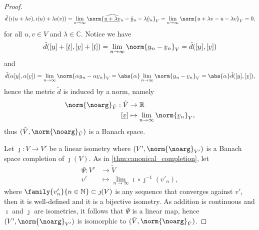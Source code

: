 \begin{proof}
\begin{equation*}
        \tilde{d}\left(\imath(u + \lambda v), \imath(u) + \lambda \imath(v)\right) = \lim_{n\to\infty}{\norm{\sequnder{\widehat{u + \lambda v}}_n - \sequnder{\hat{u}}_n - \lambda \sequnder{\hat{v}}_n}_{V}} = \lim_{n\to\infty}\norm{u + \lambda v - u - \lambda v}_V = 0,
    \end{equation*}
    for all \(u, v \in V\) and \(\lambda \in \mathbb{C}\). Notice we have
    \begin{equation*}
        \tilde{d}([\sequnder{u}] + [\sequnder{t}], [\sequnder{v}] + [\sequnder{t}]) = \lim_{n\to\infty}{\norm{\sequnder{u}_n - \sequnder{v}_n}_{V}} = \tilde{d}([\sequnder{u}],[\sequnder{v}])
    \end{equation*}
    and
    \begin{equation*}
        \tilde{d}(\alpha[\sequnder{u}], \alpha[\sequnder{v}]) = \lim_{n\to\infty}{\norm{\alpha \sequnder{u}_n - \alpha\sequnder{v}_n}_V} = \abs{\alpha} \lim_{n\to\infty}{\norm{\sequnder{u}_n - \sequnder{v}_n}_V} = \abs{\alpha} \tilde{d}([\sequnder{u}], [\sequnder{v}]),
    \end{equation*}
    hence the metric \(\tilde{d}\) is induced by a norm, namely
    \begin{align*}
        \norm{\noarg}_{\tilde{V}} : \tilde{V} &\to \mathbb{R}\\
                                [\sequnder{v}]&\mapsto \lim_{n\to\infty}{\norm{\sequnder{v}_n}_V},
    \end{align*}
    thus \((\tilde{V}, \norm{\noarg}_{\tilde{V}})\) is a Banach space.

    Let \(\jmath : V \to V'\) be a linear isometry where \((V', \norm{\noarg}_{V'})\) is a Banach space completion of \(\jmath(V)\). As in \cref{thm:canonical_completion}, let 
    \begin{align*}
        \Psi : V' &\to \tilde{V}\\
               v' &\mapsto \lim_{n\to\infty}{\imath \circ \jmath^{-1}(v'_n)},
    \end{align*}
    where \(\family{v'_n}{n \in \mathbb{N}} \subset \jmath(V)\) is any sequence that converges against \(v'\), then it is well-defined and it is a bijective isometry. As addition is continuous and \(\imath\) and \(\jmath\) are isometries, it follows that \(\Psi\) is a linear map, hence \((V', \norm{\noarg}_{V'})\) is isomorphic to \((\tilde{V}, \norm{\noarg}_{\tilde{V}})\).
\end{proof}
